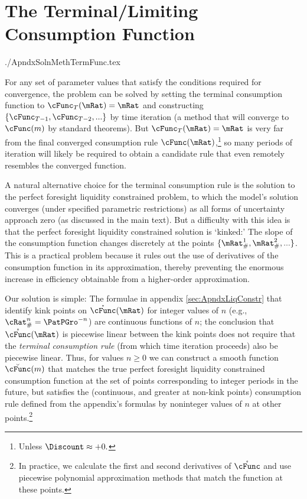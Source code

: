 \documentclass{econtex}
\begin{document}
\large{}

\section{The Terminal/Limiting Consumption Function}
\begin{verbatimwrite}{./ApndxSolnMethTermFunc.tex}

  For any set of parameter values that satisfy the conditions required
  for convergence, the problem can be solved by setting the terminal
  consumption function to $\cFunc_{T}(\mRat) = \mRat$ and constructing
  $\{\cFunc_{T-1}, \cFunc_{T-2}, ... \}$ by time iteration (a method
  that will converge to $\cFunc(m)$ by standard theorems).  But $\cFunc_{T}(\mRat)=\mRat$ is very far from
  the final converged consumption rule $\cFunc(\mRat)$,\footnote{Unless $\Discount \approx +0.$} so many
  periods of iteration will likely be required to obtain a candidate rule
  that even remotely resembles the converged function.

  A natural alternative choice for the terminal consumption rule is
  the solution to the perfect foresight liquidity constrained problem,
  to which the model's solution converges (under specified parametric
  restrictions) as all forms of uncertainty approach zero (as
  discussed in the main text).  But a difficulty with this idea is
  that the perfect foresight liquidity constrained solution is
  `kinked:' The slope of the consumption function changes discretely
  at the points $\{\mRat^{1}_{\#},\mRat^{2}_{\#},...\}$.  This is a
  practical problem because it rules out the use of derivatives of the
  consumption function in its approximation, thereby preventing the
  enormous increase in efficiency obtainable from a higher-order
  approximation.

Our solution is simple: The formulae in appendix
\ref{sec:ApndxLiqConstr} that identify kink points on
$\mathring{\cFunc}(\mRat)$ for integer values of $n$ (e.g.,
$\cRat_{\#}^{n} = \PatPGro^{-n}$) are continuous functions of $n$; the
conclusion that $\mathring{\cFunc}(\mRat)$ is piecewise linear
between the kink points does not require that the {\it terminal
  consumption rule} (from which time iteration proceeds) also be
piecewise linear.  Thus, for values $n \geq 0$ we can construct a
smooth function $\breve{\cFunc}(m)$ that matches the true perfect foresight
liquidity constrained consumption function at the set of points
corresponding to integer periods in the future, but satisfies the
(continuous, and greater at non-kink points) consumption rule defined from the
appendix's formulas by noninteger values of $n$ at other
points.\footnote{In practice, we calculate the first and second
  derivatives of $\mathring{\cFunc}$ and use piecewise polynomial
  approximation methods that match the function at these points.}



\end{verbatimwrite}
\end{document}
